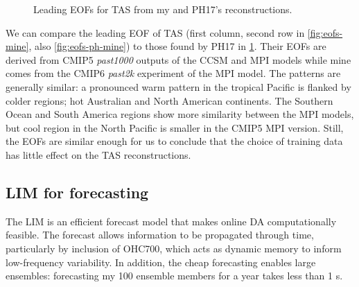 \documentclass[parskip=half,DIV=16]{scrartcl}
\begin{document}
\begin{figure}[h]
\begin{subfigure}[c]{0.3\textwidth}
     \end{subfigure}

    \caption{Leading EOFs for TAS from my and PH17's reconstructions.}
    \label{fig:eofs-ph}
\end{figure}

We can compare the leading \gls{EOF} of TAS (first column, second row in \cref{fig:eofs-mine}, also \cref{fig:eofs-ph-mine}) to those found by PH17 in \cref{fig:eofs-ph}. Their \glspl{EOF} are derived from CMIP5 \emph{past1000} outputs of the CCSM and MPI models while mine comes from the CMIP6 \emph{past2k} experiment of the MPI model. The patterns are generally similar: a pronounced warm pattern in the tropical Pacific is flanked by colder regions; hot Australian and North American continents. The Southern Ocean and South America regions show more similarity between the MPI models, but cool region in the North Pacific is smaller in the CMIP5 MPI version. Still, the \glspl{EOF} are similar enough for us to conclude that the choice of training data has little effect on the TAS reconstructions.



\subsection{LIM for forecasting}
\label{subsec:setup-lim}

The \gls{LIM} is an efficient forecast model that makes online \gls{DA} computationally feasible. The forecast allows information to be propagated through time, particularly by inclusion of OHC700, which acts as dynamic memory to inform low-frequency variability. In addition, the cheap forecasting enables large ensembles: forecasting my 100 ensemble members for a year takes less than 1 s.
\end{document}
